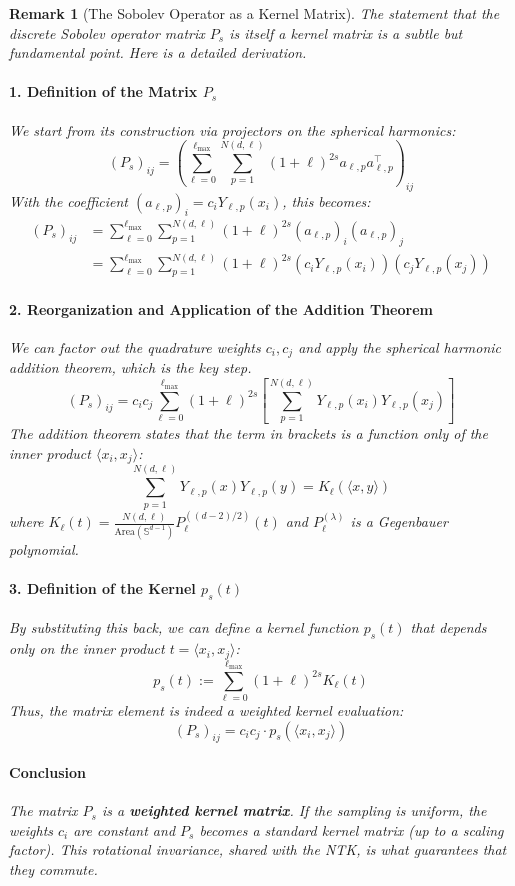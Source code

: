 \documentclass{article}
\newtheorem{remark}[theorem]{Remark}
\begin{document}
\begin{remark}[The Sobolev Operator as a Kernel Matrix]
The statement that the discrete Sobolev operator matrix $P_s$ is itself a kernel matrix is a subtle but fundamental point. Here is a detailed derivation.

\paragraph{1. Definition of the Matrix $P_s$}
We start from its construction via projectors on the spherical harmonics:
\[
(P_s)_{ij} = \left( \sum_{\ell=0}^{\ell_{\max}} \sum_{p=1}^{N(d,\ell)} (1+\ell)^{2s} a_{\ell,p}a_{\ell,p}^\top \right)_{ij}
\]
With the coefficient $(a_{\ell,p})_i = c_i Y_{\ell,p}(x_i)$, this becomes:
\begin{align*}
(P_s)_{ij} &= \sum_{\ell=0}^{\ell_{\max}} \sum_{p=1}^{N(d,\ell)} (1+\ell)^{2s} (a_{\ell,p})_i (a_{\ell,p})_j \\
&= \sum_{\ell=0}^{\ell_{\max}} \sum_{p=1}^{N(d,\ell)} (1+\ell)^{2s} (c_i Y_{\ell,p}(x_i)) (c_j Y_{\ell,p}(x_j))
\end{align*}

\paragraph{2. Reorganization and Application of the Addition Theorem}
We can factor out the quadrature weights $c_i, c_j$ and apply the spherical harmonic addition theorem, which is the key step.
\[
(P_s)_{ij} = c_i c_j \sum_{\ell=0}^{\ell_{\max}} (1+\ell)^{2s} \left[ \sum_{p=1}^{N(d,\ell)} Y_{\ell,p}(x_i) Y_{\ell,p}(x_j) \right]
\]
The addition theorem states that the term in brackets is a function only of the inner product $\langle x_i, x_j \rangle$:
\[
\sum_{p=1}^{N(d,\ell)} Y_{\ell,p}(x) Y_{\ell,p}(y) = K_\ell(\langle x, y \rangle)
\]
where $K_\ell(t) = \frac{N(d,\ell)}{\text{Area}(\mathbb{S}^{d-1})} P_\ell^{((d-2)/2)}(t)$ and $P_\ell^{(\lambda)}$ is a Gegenbauer polynomial.

\paragraph{3. Definition of the Kernel $p_s(t)$}
By substituting this back, we can define a kernel function $p_s(t)$ that depends only on the inner product $t = \langle x_i, x_j \rangle$:
\[
p_s(t) := \sum_{\ell=0}^{\ell_{\max}} (1+\ell)^{2s} K_\ell(t)
\]
Thus, the matrix element is indeed a weighted kernel evaluation:
\[
(P_s)_{ij} = c_i c_j \cdot p_s(\langle x_i, x_j \rangle)
\]

\paragraph{Conclusion}
The matrix $P_s$ is a \textbf{weighted kernel matrix}. If the sampling is uniform, the weights $c_i$ are constant and $P_s$ becomes a standard kernel matrix (up to a scaling factor). This rotational invariance, shared with the NTK, is what guarantees that they commute.
\end{remark}
\end{document}

